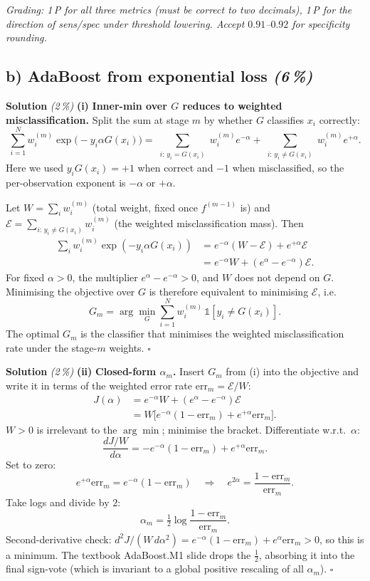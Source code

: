 \documentclass[11pt,a4paper]{article}
\newcommand{\subpoints}[1]{\textit{(#1\,\%)}}
\newcommand{\sol}{\noindent\textbf{Solution}}
\begin{document}
\noindent\emph{Grading: 1\,P for all three metrics (must be correct to two decimals), 1\,P for the
direction of sens/spec under threshold lowering. Accept $0.91$--$0.92$ for specificity rounding.}

\subsection*{b) AdaBoost from exponential loss \subpoints{6}}

\sol{} \subpoints{2} \textbf{(i)} \textbf{Inner-min over $G$ reduces to weighted misclassification.}
Split the sum at stage $m$ by whether $G$ classifies $x_i$ correctly:
$$\sum_{i=1}^N w_i^{(m)}\exp\!\bigl(-y_i\alpha G(x_i)\bigr)
   = \sum_{\substack{i:\, y_i = G(x_i)}} w_i^{(m)} e^{-\alpha}
   + \sum_{\substack{i:\, y_i \ne G(x_i)}} w_i^{(m)} e^{+\alpha}.$$
Here we used $y_i G(x_i) = +1$ when correct and $-1$ when misclassified, so the per-observation
exponent is $-\alpha$ or $+\alpha$.

Let $W = \sum_i w_i^{(m)}$ (total weight, fixed once $f^{(m-1)}$ is) and
$\mathcal E = \sum_{i:\, y_i \ne G(x_i)} w_i^{(m)}$ (the weighted misclassification mass). Then
\begin{align*}
\sum_i w_i^{(m)}\exp(-y_i\alpha G(x_i))
   &= e^{-\alpha}(W - \mathcal E) + e^{+\alpha}\mathcal E \\
   &= e^{-\alpha} W + (e^{\alpha} - e^{-\alpha})\mathcal E.
\end{align*}
For fixed $\alpha > 0$, the multiplier $e^\alpha - e^{-\alpha} > 0$, and $W$ does not depend on $G$.
Minimising the objective over $G$ is therefore equivalent to minimising $\mathcal E$, i.e.\
$$\boxed{\;G_m = \arg\!\min_G \sum_{i=1}^N w_i^{(m)}\,\mathbb 1[y_i \ne G(x_i)].\;}$$
The optimal $G_m$ is the classifier that minimises the weighted misclassification rate under the
stage-$m$ weights. $\square$

\medskip
\sol{} \subpoints{2} \textbf{(ii)} \textbf{Closed-form $\alpha_m$.} Insert $G_m$ from (i) into the
objective and write it in terms of the weighted error rate
$\mathrm{err}_m = \mathcal E / W$:
\begin{align*}
J(\alpha) &= e^{-\alpha} W + (e^{\alpha} - e^{-\alpha})\mathcal E \\
          &= W\bigl[e^{-\alpha}(1 - \mathrm{err}_m) + e^{+\alpha}\mathrm{err}_m\bigr].
\end{align*}
$W > 0$ is irrelevant to the $\arg\min$; minimise the bracket. Differentiate w.r.t.\ $\alpha$:
$$\frac{dJ/W}{d\alpha} = -e^{-\alpha}(1 - \mathrm{err}_m) + e^{+\alpha}\mathrm{err}_m.$$
Set to zero:
$$e^{+\alpha}\mathrm{err}_m = e^{-\alpha}(1 - \mathrm{err}_m)
   \quad\Longrightarrow\quad e^{2\alpha} = \frac{1 - \mathrm{err}_m}{\mathrm{err}_m}.$$
Take logs and divide by $2$:
$$\boxed{\;\alpha_m = \tfrac{1}{2}\log\!\frac{1 - \mathrm{err}_m}{\mathrm{err}_m}.\;}$$
Second-derivative check: $d^2J/(W\,d\alpha^2) = e^{-\alpha}(1-\mathrm{err}_m) + e^\alpha\mathrm{err}_m > 0$,
so this is a minimum. The textbook AdaBoost.M1 slide drops the $\tfrac{1}{2}$, absorbing it into
the final sign-vote (which is invariant to a global positive rescaling of all $\alpha_m$). $\square$
\end{document}
